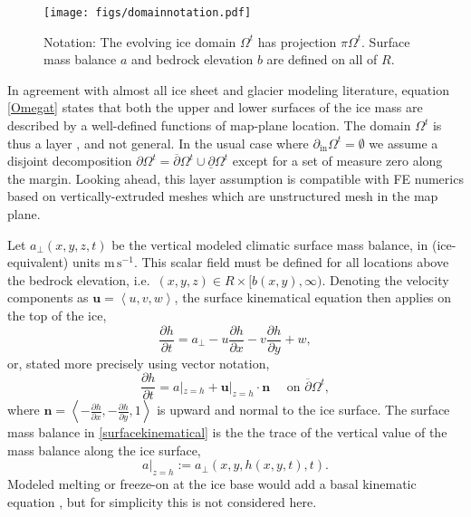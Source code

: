 \documentclass[letterpaper,final,12pt,reqno]{amsart}
\newcommand{\bn}{\mathbf{n}}
\newcommand{\bu}{\mathbf{u}}
\begin{document}
\begin{figure}[h]
\begin{center}
\texttt{[image: figs/domainnotation.pdf]}
\end{center}
\caption{Notation: The evolving ice domain $\Omega^t$ has projection $\pi \Omega^t$.  Surface mass balance $a$ and bedrock elevation $b$ are defined on all of $R$.}
\label{fig:domainnotation}
\end{figure}

In agreement with almost all ice sheet and glacier modeling literature, equation \eqref{Omegat} states that both the upper and lower surfaces of the ice mass are described by a well-defined functions of map-plane location.  The domain $\Omega^t$ is thus a layer \cite{Bueler2020}, and not general.  In the usual case where $\partial_{\text{in}} \Omega^t=\emptyset$ we assume a disjoint decomposition $\partial \Omega^t = \overline{\partial} \Omega^t \cup \underline{\partial} \Omega^t$ except for a set of measure zero along the margin.  Looking ahead, this layer assumption is compatible with FE numerics based on vertically-extruded meshes which are unstructured mesh in the map plane.

Let $a_\perp(x,y,z,t)$ be the vertical modeled climatic surface mass balance, in (ice-equivalent) units $\text{m}\,\text{s}^{-1}$.  This scalar field must be defined for all locations above the bedrock elevation, i.e.~$(x,y,z) \in R\times[b(x,y),\infty)$.  Denoting the velocity components as $\bu=\left<u,v,w\right>$, the surface kinematical equation \cite{GreveBlatter2009} then applies on the top of the ice,
    $$\frac{\partial h}{\partial t} = a_\perp - u \frac{\partial h}{\partial x} - v \frac{\partial h}{\partial y} + w,$$
or, stated more precisely using vector notation,
\begin{equation}
\frac{\partial h}{\partial t} = a|_{z=h} + \bu|_{z=h} \cdot \bn \quad \text{ on } \overline{\partial}\Omega^t, \label{surfacekinematical}
\end{equation}
where $\bn = \left<-\frac{\partial h}{\partial x},-\frac{\partial h}{\partial y},1\right>$ is upward and normal to the ice surface.  The surface mass balance in \eqref{surfacekinematical} is the the trace \cite{Evans2010} of the vertical value of the mass balance along the ice surface,
    $$a|_{z=h} := a_{\perp}(x,y,h(x,y,t),t).$$
Modeled melting or freeze-on at the ice base would add a basal kinematic equation \cite[for example]{Aschwandenetal2012}, but for simplicity this is not considered here.
\end{document}

